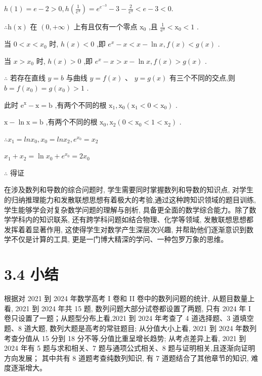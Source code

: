 \documentclass[10pt]{article}
\begin{document}
\(h\left( 1\right)  = e - 2 > 0,h\left( \frac{1}{{e}^{3}}\right)  = {e}^{{e}^{-3}} - 3 - \frac{2}{{e}^{3}} < e - 3 < 0.\)

\(\therefore \mathrm{h}\left( \mathrm{x}\right)\) 在 \(\left( {0, + \infty }\right)\) 上有且仅有一个零点 \({\mathrm{x}}_{0}\) ,且 \(\frac{1}{{\mathrm{e}}^{3}} < {\mathrm{x}}_{0} < 1\) .

当 \(0 < x < {x}_{0}\) 时, \(h\left( x\right)  < 0\) ,即 \({e}^{x} - x < x - \ln x,f\left( x\right)  < g\left( x\right)\) .

当 \(x > {x}_{0}\) 时, \(h\left( x\right)  > 0\) ,即 \({e}^{x} - x > x - \ln x,f\left( x\right)  > g\left( x\right)\) .

\(\therefore\) 若存在直线 \(y = b\) 与曲线 \(y = f\left( x\right)\) 、 \(y = g\left( x\right)\) 有三个不同的交点,则 \(b = f\left( {x}_{0}\right)  = g\left( {x}_{0}\right)  > 1\) .

此时 \({\mathrm{e}}^{\mathrm{x}} - \mathrm{x} = \mathrm{b}\) ,有两个不同的根 \({\mathrm{x}}_{1},{\mathrm{x}}_{0}\left( {{\mathrm{x}}_{1} < 0 < {\mathrm{x}}_{0}}\right)\) .

\(\mathrm{x} - \ln \mathrm{x} = \mathrm{b}\) ,有两个不同的根 \({\mathrm{x}}_{0},{\mathrm{x}}_{2}\left( {0 < {\mathrm{x}}_{0} < 1 < {\mathrm{x}}_{2}}\right)\) .

\(\therefore {x}_{1} = {ln}{x}_{0},{x}_{0} = {ln}{x}_{2},{e}^{{x}_{0}} = {x}_{2}\)

\({x}_{1} + {x}_{2} = \ln {x}_{0} + {e}^{{x}_{0}} = 2{x}_{0}\)

\(\therefore\) 得证

在涉及数列和导数的综合问题时, 学生需要同时掌握数列和导数的知识点, 对学生的归纳推理能力和发散联想思想有着极大的考验,通过这种跨知识领域的题目训练, 学生能够学会对复杂数学问题的理解与剖析, 具备更全面的数学综合能力。除了数学学科内的知识联系, 还有跨学科问题如结合物理、化学等领域, 发散联想思想都发挥着着显著作用, 这使得学生对数学产生深层次兴趣, 并帮助他们逐渐意识到数学不仅是计算的工具, 更是一门博大精深的学问、一种包罗万象的思维。

\section*{3.4 小结}

根据对 2021 到 2024 年数学高考 I 卷和 II 卷中的数列问题的统计, 从题目数量上看, 2021 到 2024 年共 15 题, 数列问题大部分试卷都设置了两题, 只有 2024 年 I 卷只设置了一题；从题型分布上看,2021 到 2024 年考查了 4 道选择题、3 道填空题、8 道大题, 数列大题是高考的常驻题目; 从分值大小上看, 2021 到 2024 年数列考查分值从 15 分到 18 分不等,分值比重呈增长趋势; 从考点差异上看, 2021 到 2024 年有 5 题与求和相关、7 题与通项公式相关、8 题与证明相关,且逐渐向证明方向发展； 其中共有 8 道题考查纯数列知识, 有 7 道题结合了其他章节的知识, 难度逐渐增大。
\end{document}
